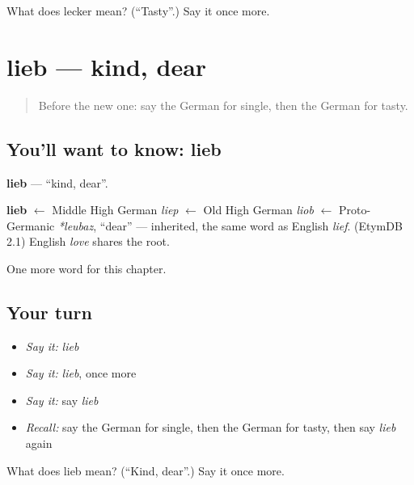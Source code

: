 \begin{tcolorbox}[breakable,colback=teal!4,colframe=teal!35!black,title={Before you move on}]
What does lecker mean? (\textquotedblleft{}Tasty\textquotedblright{}.) Say it once more.
\end{tcolorbox}
\section[lieb]{lieb — kind, dear}

\label{lesson:GE-C218-lieb}



\begin{quote}
Before the new one: say the German for single, then the German for tasty.
\end{quote}

\subsection*{You'll want to know: lieb}
\textbf{lieb} — \textquotedblleft{}kind, dear\textquotedblright{}.

\begin{cousinweb}
\textbf{lieb} $\leftarrow$ Middle High German \emph{liep} $\leftarrow$ Old High German \emph{liob} $\leftarrow$ Proto-Germanic \emph{*leubaz}, \textquotedblleft{}dear\textquotedblright{} — inherited, the same word as English \emph{lief}. (EtymDB 2.1) English \emph{love} shares the root.
\end{cousinweb}

\begin{grammarlens}[title={What you've built}]
One more word for this chapter.
\end{grammarlens}

\subsection*{Your turn}
\begin{itemize}
\raggedright
  \item \emph{Say it:} \emph{lieb}
  \item \emph{Say it:} \emph{lieb}, once more
  \item \emph{Say it:} say \emph{lieb}
  \item \emph{Recall:} say the German for single, then the German for tasty, then say \emph{lieb} again
\end{itemize}

\begin{tcolorbox}[breakable,colback=teal!4,colframe=teal!35!black,title={Before you move on}]
What does lieb mean? (\textquotedblleft{}Kind, dear\textquotedblright{}.) Say it once more.
\end{tcolorbox}
